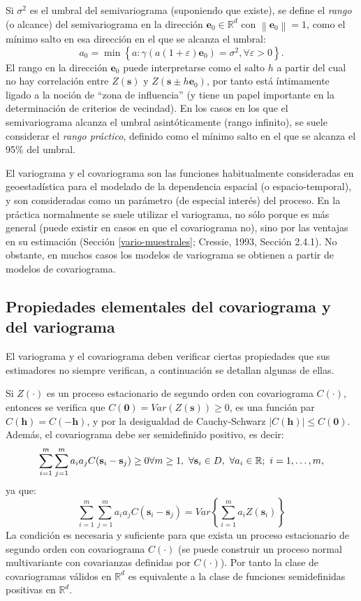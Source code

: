 \documentclass[
  spanish,
]{book}
\theoremstyle{break}
\theoremstyle{definition}
\theoremstyle{definition}
\theoremstyle{definition}
\theoremstyle{definition}
\theoremstyle{remark}
\begin{document}
Si \(\sigma ^{2}\) es el umbral del semivariograma (suponiendo que existe), se define el \emph{rango} (o alcance) del semivariograma en la dirección \(\mathbf{e}_0 \in \mathbb{R}^{d}\) con \(\left\| \mathbf{e}_0 \right\| = 1\), como el mínimo salto en esa dirección en el que se alcanza el umbral:
\[a_0 =\min \left\{ a:\gamma (a\left( 1+\varepsilon \right) \mathbf{e}_0 )=\sigma ^{2} , \forall \varepsilon >0\right\}.\]
El rango en la dirección \(\mathbf{e}_0\) puede interpretarse como el salto \(h\) a partir del cual no hay correlación entre \(Z(\mathbf{s})\) y \(Z(\mathbf{s}\pm h\mathbf{e}_0)\), por tanto está íntimamente ligado a la noción de ``zona de influencia'' (y tiene un papel importante en la determinación de criterios de vecindad).
En los casos en los que el semivariograma alcanza el umbral asintóticamente (rango infinito), se suele considerar el \emph{rango práctico}, definido como el mínimo salto en el que se alcanza el 95\% del umbral.

El variograma y el covariograma son las funciones habitualmente consideradas en geoestadística para el modelado de la dependencia espacial (o espacio-temporal), y son consideradas como un parámetro (de especial interés) del proceso.
En la práctica normalmente se suele utilizar el variograma, no sólo porque es más general (puede existir en casos en que el covariograma no), sino por las ventajas en su estimación (Sección \ref{vario-muestrales}; Cressie, 1993, Sección 2.4.1).
No obstante, en muchos casos los modelos de variograma se obtienen a partir de modelos de covariograma.

\hypertarget{propiedades-elementales}{%
\subsection{Propiedades elementales del covariograma y del variograma}\label{propiedades-elementales}}

El variograma y el covariograma deben verificar ciertas propiedades que sus estimadores no siempre verifican, a continuación se detallan algunas de ellas.

Si \(Z(\cdot)\) es un proceso estacionario de segundo orden con covariograma \(C(\cdot)\),
entonces se verifica que \(C(\mathbf{0}) = Var( Z(\mathbf{s}) ) \geq 0\), es una función par \(C(\mathbf{h})=C(-\mathbf{h})\), y por la desigualdad de Cauchy-Schwarz \(\left| C(\mathbf{h})\right| \leq C(\mathbf{0})\).
Además, el covariograma debe ser semidefinido positivo, es decir:
\[\sum\limits_{i=1}^{m} \sum\limits_{j=1}^{m} a_i a_j C(\mathbf{s}_i-\mathbf{s}_j) \geq 0  \\
\forall m\geq 1,\ \forall \mathbf{s}_i \in D,\ \forall a_i \in \mathbb{R};\ i=1, \ldots,m,\]
ya que:
\[\sum\limits_{i=1}^{m}\sum\limits_{j=1}^{m}a_i a_j C(\mathbf{s}_i -\mathbf{s}_j) = Var\left\{\sum\limits_{i=1}^{m}a_i Z(\mathbf{s}_i) \right\}\]
La condición es necesaria y suficiente para que exista un proceso estacionario de segundo orden con covariograma \(C(\cdot)\) (se puede construir un proceso normal multivariante con covarianzas definidas por \(C(\cdot)\)).
Por tanto la clase de covariogramas válidos en \(\mathbb{R}^d\) es equivalente a la clase de funciones semidefinidas positivas en \(\mathbb{R}^d\).
\end{document}
